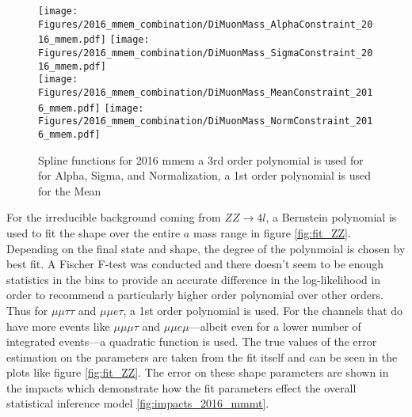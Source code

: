 \begin{figure}[ht!b]
    \centering 
    \texttt{[image: Figures/2016\_mmem\_combination/DiMuonMass\_AlphaConstraint\_2016\_mmem.pdf]}
    \texttt{[image: Figures/2016\_mmem\_combination/DiMuonMass\_SigmaConstraint\_2016\_mmem.pdf]}\\
    \texttt{[image: Figures/2016\_mmem\_combination/DiMuonMass\_MeanConstraint\_2016\_mmem.pdf]}
    \texttt{[image: Figures/2016\_mmem\_combination/DiMuonMass\_NormConstraint\_2016\_mmem.pdf]}\\
    \caption{\label{fig:spline_2016_mmem} Spline functions for 2016 mmem a 3rd order polynomial is used for  for Alpha, Sigma, and Normalization, a 1st order polynomial is used for the Mean}
\end{figure}

For the irreducible background coming from $ZZ\rightarrow 4 l$, a Bernstein polynomial is used to fit the shape over the entire $a$ mass range in figure \ref{fig:fit_ZZ}. Depending on the final state and shape, the degree of the polynmoial is chosen by best fit. A Fischer F-test was conducted and there doesn't seem to be enough statistics in the bins to provide an accurate difference in the log-likelihood in order to recommend a particularly higher order polynomial over other orders. Thus for $\mu\mu\tau\tau$ and $\mu\mu e \tau$, a 1st order polynomial is used. For the channels that do have more events like $\mu\mu\mu\tau$ and $\mu\mu e \mu$---albeit even for a lower number of integrated events---a quadratic function is used. 
The true values of the error estimation on the parameters are taken from the fit itself and can be seen in the plots like figure \ref{fig:fit_ZZ}. The error on these shape parameters are shown in the impacts which demonstrate how the fit parameters effect the overall statistical inference model \ref{fig:impacts_2016_mmmt}. 

